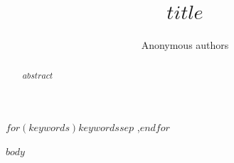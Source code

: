 \documentclass[preprint,12pt,authoryear,nopreprintline]{elsarticle}
\begin{document}
\begin{frontmatter}

\title{$title$}
\author{Anonymous authors}
\address{Affiliations withheld in the anonymous working manuscript}

\begin{abstract}
$abstract$
\end{abstract}

\begin{keyword}
$for(keywords)$$keywords$$sep$ \sep $endfor$
\end{keyword}

\end{frontmatter}

$body$

\begin{small}


\end{small}
\end{document}
